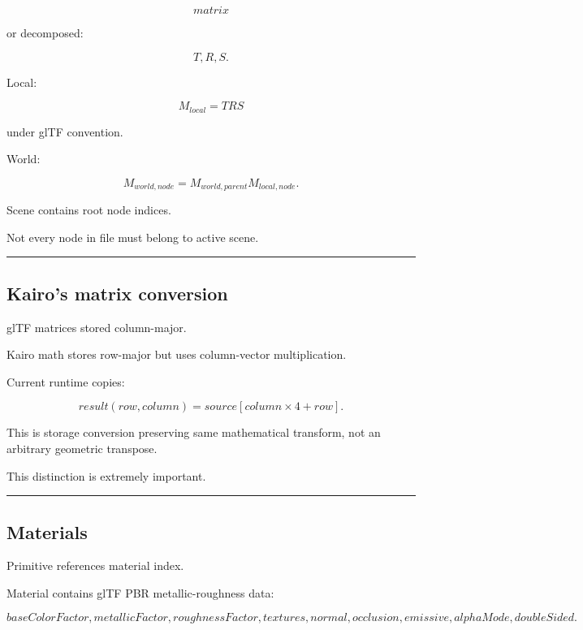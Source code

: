 \[
matrix
\]

or decomposed:

\[
T,R,S.
\]

Local:

\[
M_{local}
=
T
R
S
\]

under glTF convention.

World:

\[
\boxed{
M_{world,node}
=
M_{world,parent}
M_{local,node}.
}
\]

Scene contains root node indices.

Not every node in file must belong to active scene.

\begin{center}\rule{0.5\linewidth}{0.5pt}\end{center}

\subsection{Kairo's matrix conversion}\label{04-visual-computing-ii-ch041-kairos-matrix-conversion}

\hypertarget{04-visual-computing-ii-ch041-kairos-matrix-conversion}{}

glTF matrices stored column-major.

Kairo math stores row-major but uses column-vector multiplication.

Current runtime copies:

\[
result(row,column)
=
source[column\times4+row].
\]

This is storage conversion preserving same mathematical transform, not an arbitrary geometric transpose.

This distinction is extremely important.

\begin{center}\rule{0.5\linewidth}{0.5pt}\end{center}

\subsection{Materials}\label{04-visual-computing-ii-ch041-materials}

\hypertarget{04-visual-computing-ii-ch041-materials}{}

Primitive references material index.

Material contains glTF PBR metallic-roughness data:

\[
baseColorFactor,
metallicFactor,
roughnessFactor,
textures,
normal,
occlusion,
emissive,
alphaMode,
doubleSided.
\]

